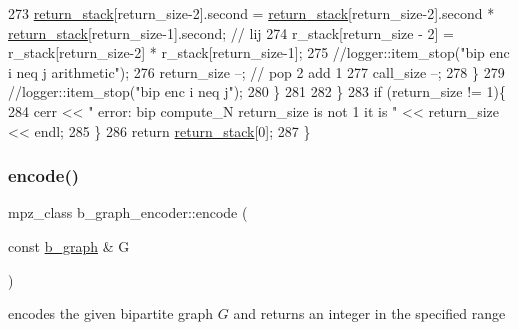 \begin{DoxyCode}
273         \hyperlink{namespacehelper__vars_a6d2100c373830cacd232319a9958652d}{return\_stack}[return\_size-2].second = \hyperlink{namespacehelper__vars_a6d2100c373830cacd232319a9958652d}{return\_stack}[return\_size-2].second * 
      \hyperlink{namespacehelper__vars_a6d2100c373830cacd232319a9958652d}{return\_stack}[return\_size-1].second; \textcolor{comment}{// lij}
274         r\_stack[return\_size - 2] = r\_stack[return\_size-2] * r\_stack[return\_size-1];
275         \textcolor{comment}{//logger::item\_stop("bip enc i neq j arithmetic");}
276         return\_size --; \textcolor{comment}{// pop 2 add 1}
277         call\_size --;
278       \}
279       \textcolor{comment}{//logger::item\_stop("bip enc i neq j");}
280     \}
281 
282   \}
283   \textcolor{keywordflow}{if} (return\_size != 1)\{
284     cerr << \textcolor{stringliteral}{" error: bip compute\_N return\_size is not 1 it is "} << return\_size << endl;
285   \}
286   \textcolor{keywordflow}{return} \hyperlink{namespacehelper__vars_a6d2100c373830cacd232319a9958652d}{return\_stack}[0];
287 \}
\end{DoxyCode}
\mbox{\label{classb__graph__encoder_a9dbf40f42a2eb12822b14ca10d580763}} 
\subsubsection{\texorpdfstring{encode()}{encode()}}
{\footnotesize\ttfamily mpz\+\_\+class b\+\_\+graph\+\_\+encoder\+::encode (\begin{DoxyParamCaption}\item[{const \hyperlink{classb__graph}{b\+\_\+graph} \&}]{G }\end{DoxyParamCaption})}



encodes the given bipartite graph $G$ and returns an integer in the specified range 


